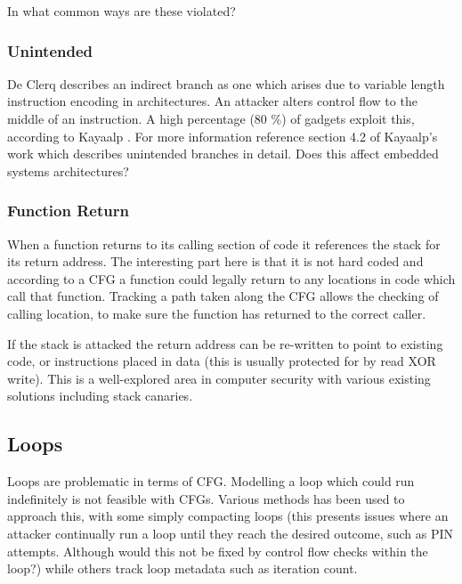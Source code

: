 In what common ways are these violated?

\subsubsection{Unintended}
De Clerq \cite{DeClercq2017} describes an indirect branch as one which arises due to variable length instruction encoding in architectures. An attacker alters control flow to the middle of an instruction. A high percentage (80 \%) of gadgets exploit this, according to Kayaalp \cite{Kayaalp2014}. For more information reference section 4.2 of Kayaalp’s work \cite{Kayaalp2014} which describes unintended branches in detail. Does this affect embedded systems architectures?

\subsubsection{Function Return}
When a function returns to its calling section of code it references the stack for its return address. The interesting part here is that it is not hard coded and according to a CFG a function could legally return to any locations in code which call that function. Tracking a path taken along the CFG allows the checking of calling location, to make sure the function has returned to the correct caller.

If the stack is attacked the return address can be re-written to point to existing code, or instructions placed in data (this is usually protected for by read XOR write). This is a well-explored area in computer security with various existing solutions including stack canaries.

\subsection{Loops}
Loops are problematic in terms of CFG. Modelling a loop which could run indefinitely is not feasible with CFGs. Various methods has been used to approach this, with some simply compacting loops (this presents issues where an attacker continually run a loop until they reach the desired outcome, such as PIN attempts. Although would this not be fixed by control flow checks within the loop?) while others \cite{Dessouky2017} track loop metadata such as iteration count.